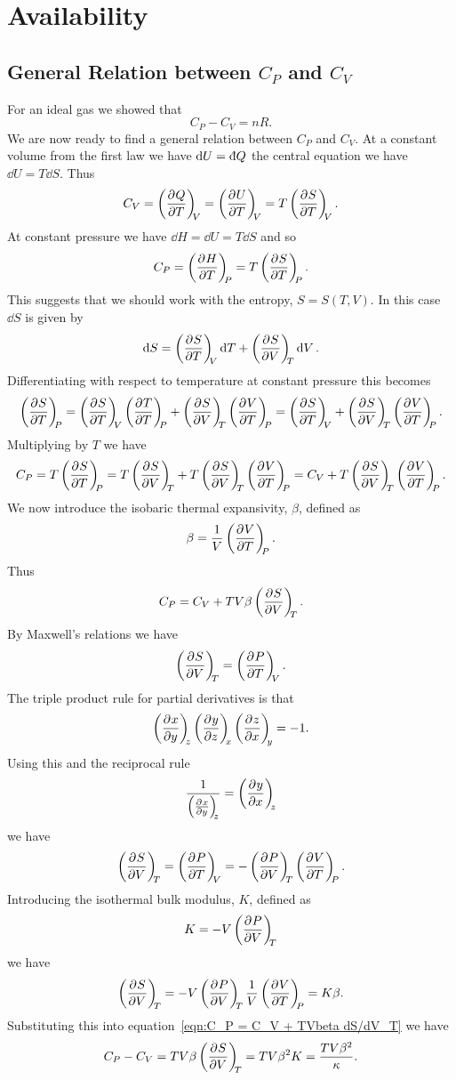     \section{Availability}
    \subsection{General Relation between \texorpdfstring{\(C_P\)}{CP} and \texorpdfstring{\(C_V\)}{CV}}
    For an ideal gas we showed that
    \[C_P - C_V = nR.\]
    We are now ready to find a general relation between \(C_P\) and \(C_V\).
    At a constant volume from the first law we have \(\dd{U} = \ddbar{Q}\) the central equation we have \(\dd{U} = T\dd{S}\).
    Thus
    \[C_V = \left(\pdv[]{Q}{T}\right)_{\!\!{V}} = \left(\pdv[]{U}{T}\right)_{\!\!{V}} = T\left(\pdv[]{S}{T}\right)_{\!\!{V}}.\]
    At constant pressure we have \(\dd{H} = \dd{U} = T\dd{S}\) and so
    \[C_P = \left(\pdv[]{H}{T}\right)_{\!\!{P}} = T\left(\pdv[]{S}{T}\right)_{\!\!{P}}.\]
    This suggests that we should work with the entropy, \(S = S(T, V)\).
    In this case \(\dd{S}\) is given by
    \[\dd{S} = \left(\pdv[]{S}{T}\right)_{\!\!{V}}\dd{T} + \left(\pdv[]{S}{V}\right)_{\!\!{T}}\dd{V}.\]
    Differentiating with respect to temperature at constant pressure this becomes
    \[\pdvconst{S}{T}{P} = \pdvconst{S}{T}{V}\pdvconst{T}{T}{P} + \pdvconst{S}{V}{T}\pdvconst{V}{T}{P} = \pdvconst{S}{T}{V} + \pdvconst{S}{V}{T}\pdvconst{V}{T}{P}.\]
    Multiplying by \(T\) we have
    \[C_P = T\pdvconst{S}{T}{P} = T\pdvconst{S}{V}{T} + T\pdvconst{S}{V}{T}\pdvconst{V}{T}{P} = C_V + T\pdvconst{S}{V}{T}\pdvconst{V}{T}{P}.\]
    We now introduce the isobaric thermal expansivity, \(\beta\), defined as
    \[\beta = \frac{1}{V}\left(\pdv[]{V}{T}\right)_{\!\!{P}}.\]
    Thus
    \begin{equation}\label{eqn:C_P = C_V + TVbeta dS/dV_T}
        C_P = C_V + TV\beta\left(\pdv[]{S}{V}\right)_{\!\!{T}}.
    \end{equation}
    By Maxwell's relations we have
    \[\left(\pdv[]{S}{V}\right)_{\!\!{T}} = \left(\pdv[]{P}{T}\right)_{\!\!{V}}.\]
    The triple product rule for partial derivatives is that
    \[\left(\pdv[]{x}{y}\right)_{\!\!{z}}\left(\pdv[]{y}{z}\right)_{\!\!{x}}\left(\pdv[]{z}{x}\right)_{\!\!{y}} = -1.\]
    Using this and the reciprocal rule
    \[\frac{1}{\left(\pdv[]{x}{y}\right)_{\!\!{z}}} = \left(\pdv[]{y}{x}\right)_{\!\!{z}}\]
    we have
    \[\pdvconst{S}{V}{T} = \pdvconst{P}{T}{V} = -\pdvconst{P}{V}{T}\pdvconst{V}{T}{P}.\]
    Introducing the isothermal bulk modulus, \(K\), defined as
    \[K = -V\left(\pdv[]{P}{V}\right)_{\!\!{T}}\]
    we have
    \[\left(\pdv[]{S}{V}\right)_{\!\!{T}} = -V\left(\pdv[]{P}{V}\right)_{\!\!{T}}\frac{1}{V}\left(\pdv[]{V}{T}\right)_{\!\!{P}} = K\beta.\]
    Substituting this into equation~\ref{eqn:C_P = C_V + TVbeta dS/dV_T} we have
    \[C_P - C_V = TV\beta\left(\pdv[]{S}{V}\right)_{\!\!{T}} = TV\beta^2 K = \frac{TV\beta^2}{\kappa}.\]
